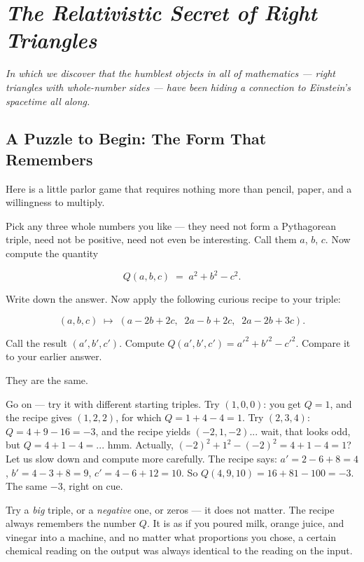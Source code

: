 \chapter{\textit{The Relativistic Secret of Right Triangles}}
\label{ch16}


\textit{In which we discover that the humblest objects in all of mathematics --- right triangles with whole-number sides --- have been hiding a connection to Einstein's spacetime all along.}


\bigskip


\section{A Puzzle to Begin: The Form That Remembers}

Here is a little parlor game that requires nothing more than pencil, paper, and a willingness to multiply.

Pick any three whole numbers you like --- they need not form a Pythagorean triple, need not be positive, need not even be interesting. Call them $a$, $b$, $c$. Now compute the quantity

\[
Q(a, b, c) \;=\; a^2 + b^2 - c^2.
\]

Write down the answer. Now apply the following curious recipe to your triple:

\[
(a, b, c) \;\longmapsto\; (a - 2b + 2c,\;\; 2a - b + 2c,\;\; 2a - 2b + 3c).
\]

Call the result $(a', b', c')$. Compute $Q(a', b', c') = a'^2 + b'^2 - c'^2$. Compare it to your earlier answer.

They are the same.

Go on --- try it with different starting triples. Try $(1, 0, 0)$: you get $Q = 1$, and the recipe gives $(1, 2, 2)$, for which $Q = 1 + 4 - 4 = 1$. Try $(2, 3, 4)$: $Q = 4 + 9 - 16 = -3$, and the recipe yields $(-2, 1, -2)$... wait, that looks odd, but $Q = 4 + 1 - 4 = ... $ hmm. Actually, $(-2)^2 + 1^2 - (-2)^2 = 4 + 1 - 4 = 1$? Let us slow down and compute more carefully. The recipe says: $a' = 2 - 6 + 8 = 4$, $b' = 4 - 3 + 8 = 9$, $c' = 4 - 6 + 12 = 10$. So $Q(4, 9, 10) = 16 + 81 - 100 = -3$. The same $-3$, right on cue.

Try a \textit{big} triple, or a \textit{negative} one, or zeros --- it does not matter. The recipe always remembers the number $Q$. It is as if you poured milk, orange juice, and vinegar into a machine, and no matter what proportions you chose, a certain chemical reading on the output was always identical to the reading on the input.

